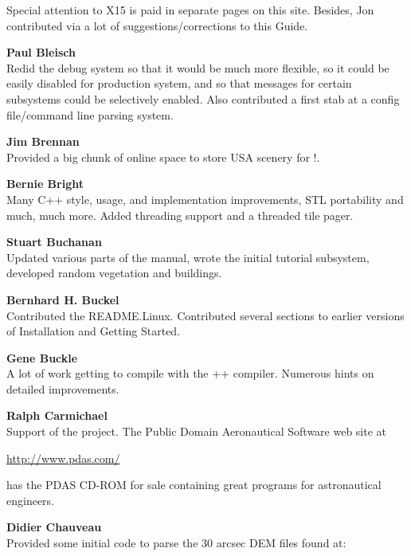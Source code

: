 \noindent
  Special attention to X15 is paid in separate pages on this site. Besides, Jon
  contributed via a lot of suggestions/corrections to this Guide.
\medskip

\noindent \textbf{Paul Bleisch}\\
  Redid the debug system so that it would be much more
  flexible, so it could be easily disabled for production system, and
  so that messages for certain subsystems could be selectively
  enabled. Also contributed a first stab at a config file/command line parsing
  system.
 \medskip


\noindent \textbf{Jim Brennan}\\
  Provided a big chunk of online space to store USA scenery for \FlightGear{}$!$.
 \medskip

\noindent \textbf{Bernie Bright}\\
  Many C++ style, usage, and implementation improvements, STL
  portability and much, much more.
  Added threading support and a threaded tile pager.
 \medskip

\noindent \textbf{Stuart Buchanan}\\
 Updated various parts of the manual, wrote the initial tutorial subsystem, developed
 random vegetation and buildings.
 \medskip

\noindent \textbf{Bernhard H. Buckel}\\
  Contributed the README.Linux.  Contributed several sections to earlier versions of
 Installation and Getting Started.
 \medskip

\noindent \textbf{Gene Buckle}\\
  A lot of work getting \FlightGear{} to compile with the ++
  compiler. Numerous hints on detailed improvements.
 \medskip


\noindent \textbf{Ralph Carmichael}\\
  Support of the project. The Public Domain Aeronautical Software web site at
\medskip

\href{http://www.pdas.com/}{http://www.pdas.com/}
 \medskip

 \noindent
 has the PDAS CD-ROM for sale containing great programs for astronautical engineers.

\noindent \textbf{Didier Chauveau}\\
  Provided some initial code to parse the 30 arcsec DEM files found at:
   \medskip

